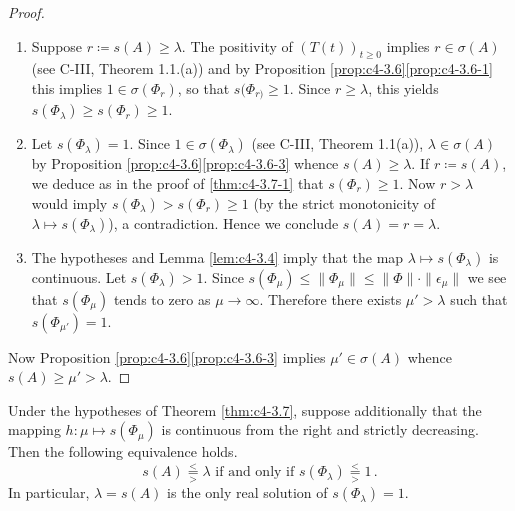 \begin{proof}
\begin{enumerate}[\upshape (i), wide, labelindent=.5em] 
\item%
Suppose $r \coloneqq s(A) \geq \lambda$. 
The positivity of $(T(t))_{t \geq 0}$ implies $r \in \sigma(A)$ (see C-III, Theorem 1.1.(a)) and by Proposition \ref{prop:c4-3.6}\ref{prop:c4-3.6-1}  this implies $1 \in \sigma(\Phi_r)$, so that $s(\Phi_{r)} \geq 1$. 
Since $r \geq \lambda$, this yields $s(\Phi_{\lambda}) \geq s(\Phi_{r}) \geq 1$.

\item 
Let $s(\Phi_{\lambda}) = 1$. 
Since $1 \in \sigma(\Phi_{\lambda})$ (see C-III, Theorem 1.1(a)), $\lambda \in \sigma(A)$ by Proposition \ref{prop:c4-3.6}\ref{prop:c4-3.6-3} whence $s(A) \geq \lambda$. 
If $r \coloneqq s(A)$, we deduce as in the proof of \ref{thm:c4-3.7-1} that $s(\Phi_{r}) \geq 1$. 
Now $r > \lambda$ would imply $s(\Phi_{\lambda}) > s(\Phi_{r}) \geq 1$ (by the strict monotonicity of $\lambda \mapsto s(\Phi_{\lambda})$), a contradiction. Hence we conclude $s(A) = r = \lambda$.

\item 
The hypotheses and Lemma \ref{lem:c4-3.4} imply that the map $\lambda \mapsto s(\Phi_{\lambda})$ is continuous. 
Let $s(\Phi_{\lambda}) > 1$. 
Since $s(\Phi_{\mu}) \leq \|\Phi_{\mu}\| \leq \|\Phi\| \cdot \|\epsilon_{\mu}\|$ we see that $s(\Phi_{\mu})$ tends to zero as $\mu \to \infty$. 
Therefore there exists $\mu' > \lambda$ such that $s(\Phi_{\mu'}) = 1$. 
\end{enumerate} 
Now Proposition \ref{prop:c4-3.6}\ref{prop:c4-3.6-3}  implies $\mu' \in \sigma(A)$ whence $s(A) \geq \mu' > \lambda$.
\end{proof}
\begin{corollary}\label{cor:c4-3.8}
%
%
Under the hypotheses of Theorem \ref{thm:c4-3.7}, suppose additionally that the mapping $h: \mu \mapsto s(\Phi_{\mu})$ is continuous from the right and strictly decreasing. Then the following equivalence holds.
\begin{equation}\label{eq:c4-3.9}
s(A) 
\overset{<}{ \underset{>}{=} }
\lambda 
\text{ if and only if } 
s(\Phi_{\lambda}) 
\overset{<}{ \underset{>}{=} }
1\,.
\end{equation}
In particular, $\lambda = s(A)$ is the only real solution of $s(\Phi_{\lambda}) = 1$.
\end{corollary}
